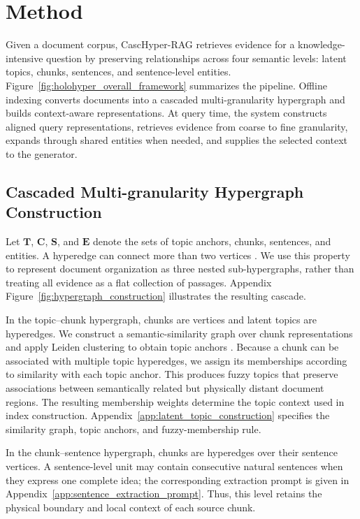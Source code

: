 \documentclass{article} %
\begin{document}
\section{Method}\label{sec:method}

Given a document corpus, CascHyper-RAG retrieves evidence for a knowledge-intensive question by preserving relationships across four semantic levels: latent topics, chunks, sentences, and sentence-level entities. Figure~\ref{fig:holohyper_overall_framework} summarizes the pipeline. Offline indexing converts documents into a cascaded multi-granularity hypergraph and builds context-aware representations. At query time, the system constructs aligned query representations, retrieves evidence from coarse to fine granularity, expands through shared entities when needed, and supplies the selected context to the generator.

\subsection{Cascaded Multi-granularity Hypergraph Construction}

Let $\mathbf{T}$, $\mathbf{C}$, $\mathbf{S}$, and $\mathbf{E}$ denote the sets of topic anchors, chunks, sentences, and entities. A hyperedge can connect more than two vertices \citep{Zhou2006Hypergraphs}. We use this property to represent document organization as three nested sub-hypergraphs, rather than treating all evidence as a flat collection of passages. Appendix Figure~\ref{fig:hypergraph_construction} illustrates the resulting cascade.

In the topic--chunk hypergraph, chunks are vertices and latent topics are hyperedges. We construct a semantic-similarity graph over chunk representations and apply Leiden clustering to obtain topic anchors \citep{Traag2019Leiden}. Because a chunk can be associated with multiple topic hyperedges, we assign its memberships according to similarity with each topic anchor. This produces fuzzy topics that preserve associations between semantically related but physically distant document regions. The resulting membership weights determine the topic context used in index construction. Appendix~\ref{app:latent_topic_construction} specifies the similarity graph, topic anchors, and fuzzy-membership rule.

In the chunk--sentence hypergraph, chunks are hyperedges over their sentence vertices. A sentence-level unit may contain consecutive natural sentences when they express one complete idea; the corresponding extraction prompt is given in Appendix~\ref{app:sentence_extraction_prompt}. Thus, this level retains the physical boundary and local context of each source chunk.
\end{document}
